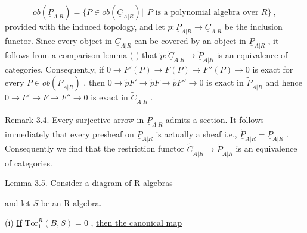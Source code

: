 \begin{equation*}
ob(\underline{P}_{A|R}) = \{P \in ob(\underline{C}_{A|R})|\ \ P \text{ is a polynomial algebra over } R\} \ ,
\end{equation*}
provided with the induced topology, and let  $p : \underline{P}_{A|R} \to \underline{C}_{A|R}$  be the inclusion functor. Since every object in  $\underline{C}_{A|R}$  can be covered by an object in  $\underline{P}_{A|R}$ , it follows from a comparison lemma (          ) that  $\widetilde{p} : \widetilde{\underline{C}}_{A|R} \to \widetilde{\underline{P}}_{A|R}$  is an equivalence of categories. Consequently, if  $0 \to F'(P) \to F(P) \to F''(P) \to 0$  is exact for every  $P \in ob(\underline{P}_{A|R})$ , then  $0 \to \widetilde{p}F' \to \widetilde{p}F \to \widetilde{p}F'' \to 0$  is exact in  $\widetilde{\underline{P}}_{A|R}$  and hence  $0 \to F' \to F \to F'' \to 0$  is exact in  $\widetilde{\underline{C}}_{A|R}$  .



\underline{Remark} 3.4.  Every surjective arrow in  $\underline{P}_{A|R}$  admits a section. It follows immediately that every presheaf on  $\underline{P}_{A|R}$  is actually a sheaf i.e.,  $\widetilde{\underline{P}}_{A|R} = \underline{P}_{A|R}$ . Consequently we find that the restriction functor  $\widetilde{\underline{C}}_{A|R} \to \check{\underline{P}}_{A|R}$  is an equivalence of categories.

\underline{Lemma} 3.5.  \underline{Consider a diagram of R-algebras}

\begin{center}
\end{center}
\underline{and let}  $S$  \underline{be an R-algebra.}

(i)  \underline{If}  $\mathrm{Tor}^{R}_{1}(B,S) = 0$  , \underline{then the canonical map}

